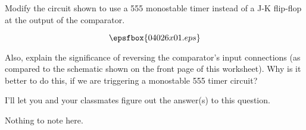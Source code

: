 

Modify the circuit shown to use a 555 monostable timer instead of a J-K flip-flop at the output of the comparator.  

$$\epsfbox{04026x01.eps}$$

Also, explain the significance of reversing the comparator's input connections (as compared to the schematic shown on the front page of this worksheet).  Why is it better to do this, if we are triggering a monostable 555 timer circuit?







I'll let you and your classmates figure out the answer(s) to this question.







Nothing to note here.



